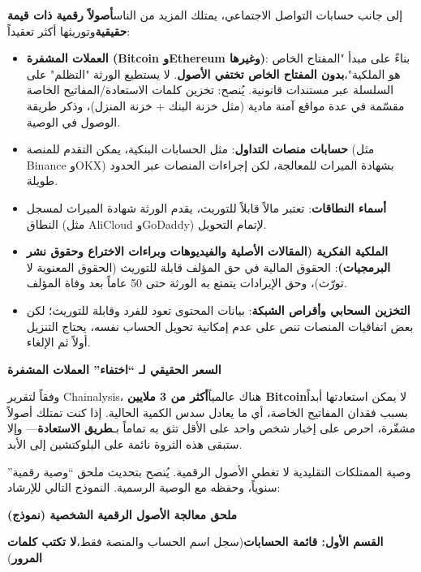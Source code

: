 
إلى جانب حسابات التواصل الاجتماعي، يمتلك المزيد من الناس\textbf{أصولاً رقمية ذات قيمة حقيقية}وتوريثها أكثر تعقيداً:

\begin{itemize}
  \item \textbf{العملات المشفرة (Bitcoin وEthereum وغيرها)}: بناءً على مبدأ "المفتاح الخاص هو الملكية"،\textbf{بدون المفتاح الخاص تختفي الأصول}. لا يستطيع الورثة "التظلم" على السلسلة عبر مستندات قانونية. يُنصح: تخزين كلمات الاستعادة/المفاتيح الخاصة مقسّمة في عدة مواقع آمنة مادية (مثل خزنة البنك + خزنة المنزل)، وذكر طريقة الوصول في الوصية.
  \item \textbf{حسابات منصات التداول}: مثل الحسابات البنكية، يمكن التقدم للمنصة (مثل Binance وOKX) بشهادة الميراث للمعالجة، لكن إجراءات المنصات عبر الحدود طويلة.
  \item \textbf{أسماء النطاقات}: تعتبر مالاً قابلاً للتوريث، يقدم الورثة شهادة الميراث لمسجل النطاق (مثل AliCloud وGoDaddy) لإتمام التحويل.
  \item \textbf{الملكية الفكرية (المقالات الأصلية والفيديوهات وبراءات الاختراع وحقوق نشر البرمجيات)}: الحقوق المالية في حق المؤلف قابلة للتوريث (الحقوق المعنوية لا تورّث)، وحق الإيرادات يتمتع به الورثة حتى 50 عاماً بعد وفاة المؤلف.
  \item \textbf{التخزين السحابي وأقراص الشبكة}: بيانات المحتوى تعود للفرد وقابلة للتوريث؛ لكن بعض اتفاقيات المنصات تنص على عدم إمكانية تحويل الحساب نفسه، يحتاج التنزيل أولاً ثم الإلغاء.
\end{itemize}

\textbf{السعر الحقيقي لـ “اختفاء” العملات المشفرة}\par

وفقاً لتقرير Chainalysis، هناك عالمياً\textbf{أكثر من 3 ملايين Bitcoin}لا يمكن استعادتها أبداً بسبب فقدان المفاتيح الخاصة، أي ما يعادل سدس الكمية الحالية. إذا كنت تمتلك أصولاً مشفّرة، احرص على إخبار شخص واحد على الأقل تثق به تماماً بـ\textbf{طريق الاستعادة}— وإلا ستبقى هذه الثروة نائمة على البلوكتشين إلى الأبد.


وصية الممتلكات التقليدية لا تغطي الأصول الرقمية. يُنصح بتحديث ملحق “وصية رقمية” سنوياً، وحفظه مع الوصية الرسمية. النموذج التالي للإرشاد:

\textbf{ملحق معالجة الأصول الرقمية الشخصية (نموذج)}\par

\textbf{القسم الأول: قائمة الحسابات}(سجل اسم الحساب والمنصة فقط،\textbf{لا تكتب كلمات المرور})

